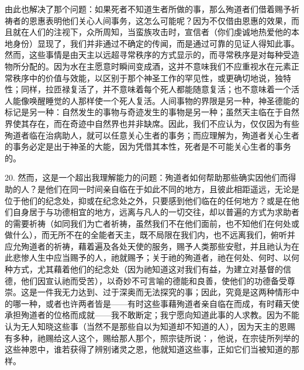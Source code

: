 由此也解决了那个问题：如果死者不知道生者所做的事，那么殉道者们借着赐予祈祷者的恩惠表明他们关心人间事务，这怎么可能呢？因为不仅借由恩惠的效果，而且就在人们的注视下，众所周知，当蛮族攻击时，宣信者（你们虔诚地热爱他的本地身份）显现了，我们并非通过不确定的传闻，而是通过可靠的见证人得知此事。然而，这些事情是由天主以远超寻常秩序的方式显示的，而寻常秩序是对每种受造物所分配的。因为水在主愿意时瞬间变成酒，这并不意味我们不应重视水在元素正常秩序中的价值与效能，以区别于那个神圣工作的罕见性，或更确切地说，独特性；同样，拉匝禄复活了，并不意味着每个死人都能随意复活；也不意味着一个活人能像唤醒睡觉的人那样使一个死人复活。人间事物的界限是另一种，神圣德能的标记是另一种：自然发生的事物与奇迹发生的事物是另一种；虽然天主临在于自然界使其存在，而在奇迹中自然界也并非缺席。因此，我们不应认为，仅仅因为有些殉道者临在治病助人，就可以任意关心生者的事务；而应理解为，殉道者关心生者的事务必定是出于神圣的大能，因为凭借其本性，死者是不可能关心生者的事务的。\par

20. 然而，这是一个超出我理解能力的问题：殉道者如何帮助那些确实因他们而得助的人？是他们在同一时间亲自临在于如此不同的地方，且彼此相距遥远，无论是位于他们的纪念处，抑或在纪念处之外，只要感到他们临在的任何地方？或是在他们自身居于与功德相宜的地方，远离与凡人的一切交往，却以普遍的方式为求助者的需要祈祷（如同我们为亡者祈祷，虽然我们不在他们面前，也不知他们在何处或做什么），而无所不在的全能者天主，既不局限在我们内，也不远离我们，俯听并应允殉道者的祈祷，藉着遍及各处天使的服务，赐予人类那些安慰，并且祂认为在此悲惨人生中应当赐予的人，祂就赐予；关于祂的殉道者，祂在何处、何时、以何种方式，尤其藉着他们的纪念处（因为祂知道这对我们有益，为建立对基督的信德，他们因宣认祂而受苦），以奇妙不可言喻的德能和良善，使他们的功德备受尊崇。这是一件我无力达到、过于深奥而无法探究的事；因此，究竟是这两种情形中的哪一种，或者也许两者皆是——有时这些事藉殉道者亲自临在而成，有时藉天使承担殉道者的位格而成就——我不敢断定；我宁愿向知道此事的人求教。因为不能认为无人知晓这些事（当然不是那些自以为知道却不知道的人），因为天主的恩赐有多种，祂赐给这人这个，赐给那人那个，照宗徒所说：，他说，在宗徒所列举的这些神恩中，谁若获得了辨别诸灵之恩，他就知道这些事，正如它们当被知道的那样。\par

